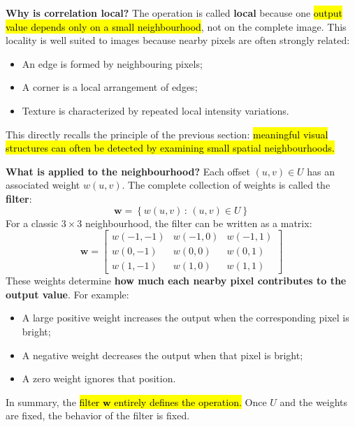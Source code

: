 \noindent
\textcolor{Green3}{ \textbf{Why is correlation local?}} The operation is called \textbf{local} because one \hl{output value depends only on a small neighbourhood}, not on the complete image. This locality is well suited to images because nearby pixels are often strongly related:
\begin{itemize}
    \item An edge is formed by neighbouring pixels;
    \item A corner is a local arrangement of edges;
    \item Texture is characterized by repeated local intensity variations.
\end{itemize}
This directly recalls the principle of the previous section: \hl{meaningful visual structures can often be detected by examining small spatial neighbourhoods.}

\highspace
\textcolor{Green3}{ \textbf{What is applied to the neighbourhood?}} Each offset $\left(u,v\right) \in U$ has an associated weight $w\left(u,v\right)$. The complete collection of weights is called the \textbf{filter}:
\begin{equation*}
    \mathbf{w} = \left\{w\left(u,v\right) \, : \, \left(u,v\right) \in U\right\}
\end{equation*}
For a classic $3 \times 3$ neighbourhood, the filter can be written as a matrix:
\begin{equation*}
    \mathbf{w} =
    \begin{bmatrix}
        w(-1,-1) & w(-1,0) & w(-1,1) \\
        w(0,-1) & w(0,0) & w(0,1) \\
        w(1,-1) & w(1,0) & w(1,1)
    \end{bmatrix}
\end{equation*}
These weights determine \textbf{how much each nearby pixel contributes to the output value}. For example:
\begin{itemize}
    \item A large positive weight increases the output when the corresponding pixel is bright;
    \item A negative weight decreases the output when that pixel is bright;
    \item A zero weight ignores that position.
\end{itemize}
In summary, the \hl{filter $\mathbf{w}$ entirely defines the operation.} Once $U$ and the weights are fixed, the behavior of the filter is fixed.


